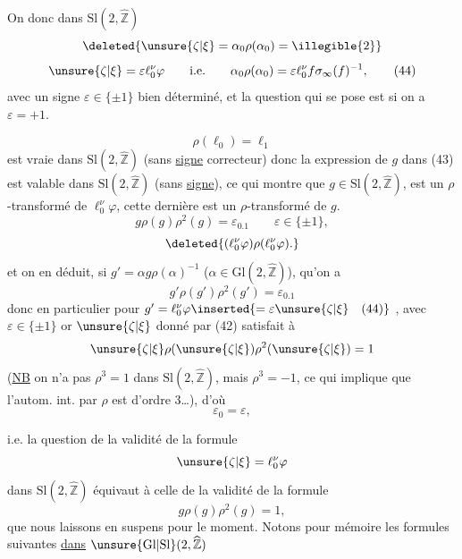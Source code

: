 On  donc dans $\mathrm{Sl}(2,\widehat{\mathbb Z})$
\[
 \deleted{\unsure{\zeta|\xi}=\alpha_0\rho(\alpha_0)=\illegible{2}}
\]
\[
 \unsure{\zeta|\xi}=\varepsilon\ell_0^\nu\varphi
 \qquad\text{i.e.}\qquad
 \alpha_0\rho(\alpha_0)=\varepsilon\ell_0^\nu f\sigma_\infty(f)^{-1},
 \tag{44}
\]
avec un signe $\varepsilon\in\{\pm1\}$ bien déterminé, et la question qui se pose est si on a  $\varepsilon=+1$.

\[
 \rho(\ell_0)=\ell_1
\]
est vraie dans $\mathrm{Sl}(2,\widehat{\mathbb Z})$ (sans \uline{signe} correcteur) donc la  expression de $g$ dans (43) est valable dans $\mathrm{Sl}(2,\widehat{\mathbb Z})$ (sans \uline{signe}), ce qui montre que $g\in\mathrm{Sl}(2,\widehat{\mathbb Z})$,  est un $\rho$-transformé de $\ell_0^\nu\varphi$,  cette dernière est un $\rho$-transformé de $g$.
\[
 g\rho(g)\rho^2(g)=\varepsilon_0.1
 \qquad\varepsilon\in\{\pm1\},
\]
\[
 \deleted{(\ell_0^\nu\varphi)\rho(\ell_0^\nu\varphi).}
\]
et  on en déduit, si $g'=\alpha g\rho(\alpha)^{-1}$
\deleted{\unsure{$\rho^2\in$}} ($\alpha\in\mathrm{Gl}(2,\widehat{\mathbb Z})$), qu'on a
\[
 g'\rho(g')\rho^2(g')=\varepsilon_0.1
\]
donc en particulier pour $g'=\ell_0^\nu\varphi\inserted{=\varepsilon\unsure{\zeta|\xi}\quad\text{(44)}}$ , avec $\varepsilon\in\{\pm1\}$  or $\unsure{\zeta|\xi}$ donné par (42) satisfait à
\[
 \unsure{\zeta|\xi}\rho(\unsure{\zeta|\xi})\rho^2(\unsure{\zeta|\xi})=1
\]
(\uline{NB} on n'a pas $\rho^3=1$ dans $\mathrm{Sl}(2,\widehat{\mathbb Z})$, mais $\rho^3=-1$, ce qui implique que l'autom. int.   par $\rho$ est d'ordre 3\ldots), d'où
\[
 \varepsilon_0=\varepsilon,
\]


i.e. la question de la validité de la formule
\[
 \unsure{\zeta|\xi}=\ell_0^\nu\varphi
\]
dans $\mathrm{Sl}(2,\widehat{\mathbb Z})$ équivaut à celle de la validité de la formule
\[
 g\rho(g)\rho^2(g)=1,
\]
que nous laissons en suspens pour le moment. Notons pour mémoire les formules suivantes \uline{dans} \uline{$\unsure{\mathrm{Gl}|\mathrm{Sl}}(2,\widehat{\mathbb Z})$}

